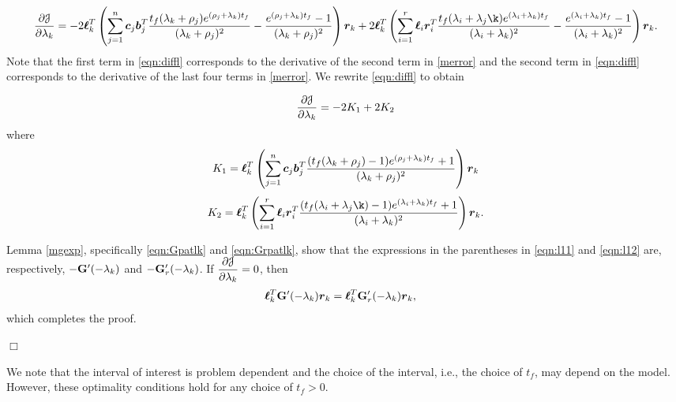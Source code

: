 \documentclass[twocolumn]{autart}
\begin{document}
\begin{dmath}\label{eqn:diffl}
\pder[\J]{\lambda_k}=-2\lc_k^T \left(\sum_{j=1}^n \cc_j\bb_j^T \dfrac{{\tf}(\lambda_k+\rho_j)e^{(\rho_j+\lambda_k){\tf}}} {(\lambda_k+\rho_j)^2}     -\dfrac       {e^{(\rho_j+\lambda_k){\tf}}-1}{(\lambda_k+\rho_j)^2}\right)\rc_k 
+2\lc_k^T \left(\sum^r_{i=1} \lc_i\rc_i^T\dfrac{{\tf}(\lambda_i+\lambda_j\k)e^{(\lambda_i+\lambda_k){\tf}}}  {(\lambda_i+\lambda_k)^2}         -\dfrac{e^{(\lambda_i+\lambda_k){\tf}}-1}{(\lambda_i+\lambda_k)^2}\right)\rc_k.
\end{dmath}
{\color{black}
Note that the first term in \eqref{eqn:diffl} corresponds to the derivative of the second term in \eqref{merror} and the second term in \eqref{eqn:diffl} corresponds to the derivative of the last four terms in \eqref{merror}.}
We rewrite \eqref{eqn:diffl} to obtain 

\begin{dmath}
\pder[\J]{\lambda_k} =-2K_1+2K_2
\end{dmath}
where
\begin{dmath}\label{eqn:l11} 
K_1=\lc_k^T \left(\sum_{j=1}^n \cc_j\bb_j^T \dfrac{({\tf}(\lambda_k+\rho_j)-1)e^{(\rho_j+\lambda_k){\tf}}+1}{(\lambda_k+\rho_j)^2}\right)\rc_k  
\end{dmath}
\begin{dmath}\label{eqn:l12} 
K_2=\lc_k^T \left(\sum^r_{i=1} \lc_i\rc_i^T\dfrac{({\tf}(\lambda_i+\lambda_j\k)-1)e^{(\lambda_i+\lambda_k){\tf}}+1}{(\lambda_i+\lambda_k)^2}\right)\rc_k.
\end{dmath}


Lemma \eqref{mgexp}, specifically \eqref{eqn:Gpatlk} and \eqref{eqn:Grpatlk}, show that the expressions in the parentheses in \eqref{eqn:l11}  and \eqref{eqn:l12}   are, respectively, $-\G'(-\lambda_k)$ and $-\G_r'(-\lambda_k)$.
If $\pder[\J]{\lambda_k}= 0$, then
\begin{align*}
\lc_k^T\G'(-\lambda_k)\rc_k&=\lc_k^T\G_r'(-\lambda_k)\rc_k,
\end{align*}
which completes the proof.
\begin{flushright} $\Box$  \end{flushright}
{\color{black} We note that the interval of interest is problem dependent and the choice of the interval, i.e., the choice of $t_f$, may depend on the model. However, these optimality conditions hold for any choice of $t_f>0$.}
\end{document}
